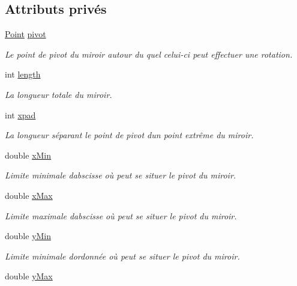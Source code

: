 \subsection*{Attributs privés}
\begin{DoxyCompactItemize}
\item 
\hyperlink{classPoint}{Point} \hyperlink{classMirror_aeec9a930fcc8f87373a5ca5c403edc53}{pivot}
\begin{DoxyCompactList}\small\item\em Le point de pivot du miroir autour du quel celui-\/ci peut effectuer une rotation. \end{DoxyCompactList}\item 
int \hyperlink{classMirror_a03f7e5469eaa52fa2090542182f99fbd}{length}
\begin{DoxyCompactList}\small\item\em La longueur totale du miroir. \end{DoxyCompactList}\item 
int \hyperlink{classMirror_aef41f122c76a825af7d12eaddf6ff1ea}{xpad}
\begin{DoxyCompactList}\small\item\em La longueur séparant le point de pivot d\textquotesingle{}un point extrême du miroir. \end{DoxyCompactList}\item 
double \hyperlink{classMirror_a797115030b6a7bded6bab18a080e30c6}{x\+Min}
\begin{DoxyCompactList}\small\item\em Limite minimale d\textquotesingle{}abscisse où peut se situer le pivot du miroir. \end{DoxyCompactList}\item 
double \hyperlink{classMirror_ab0e8322594aeb39432b4696d67e3ba6d}{x\+Max}
\begin{DoxyCompactList}\small\item\em Limite maximale d\textquotesingle{}abscisse où peut se situer le pivot du miroir. \end{DoxyCompactList}\item 
double \hyperlink{classMirror_a4b18a9326165e36b1ae05604b34ce758}{y\+Min}
\begin{DoxyCompactList}\small\item\em Limite minimale d\textquotesingle{}ordonnée où peut se situer le pivot du miroir. \end{DoxyCompactList}\item 
double \hyperlink{classMirror_a2e76c506f910e388db245355ab17ce3a}{y\+Max}

\end{DoxyCompactItemize}

